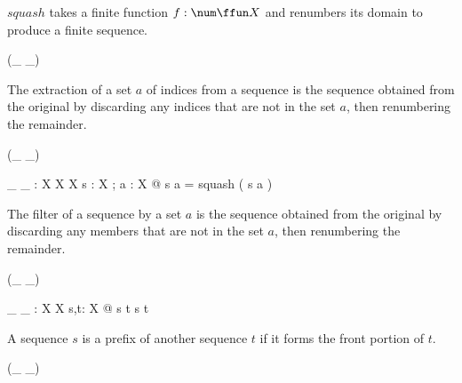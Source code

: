 \documentclass[draft,a4paper,10pt,wd]{isov2}
\begin{document}
$squash$ takes a finite function $f : \num \ffun X$
and renumbers its domain to produce a finite sequence.


\begin{zed}
 \rightassoc (\_ \extract \_)
\end{zed}


The extraction of a set $a$ of indices from a sequence
is the sequence obtained from the original by discarding any indices
that are not in the set $a$,
then renumbering the remainder.


\begin{zed}
 \leftassoc (\_ \filter \_)
\end{zed}

\begin{gendef}[X]
\_ \filter \_ : \seq X \cross \power X \fun \seq X
\where
\forall s : \seq X ; a : \power X @
	s \filter a = squash ( s \rres a )
\end{gendef}

The filter of a sequence by a set $a$
is the sequence obtained from the original by discarding any members
that are not in the set $a$,
then renumbering the remainder.


\begin{zed}
\relation (\_ \prefix \_)
\end{zed}

\begin{gendef}[X]
\_ \prefix \_ : \seq X \rel \seq X
\where
\forall s,t: \seq X @
s \prefix t \iff s \subseteq t
\end{gendef}

A sequence $s$ is a prefix of another sequence $t$
if it forms the front portion of $t$.


\begin{zed}
\relation (\_ \suffix \_)
\end{zed}
\end{document}
